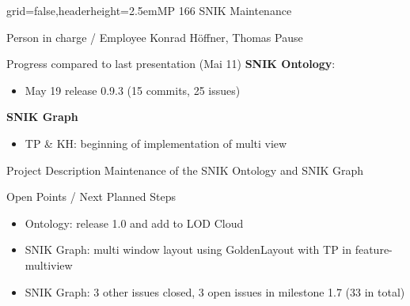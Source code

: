 \documentclass[english]{kiesgrube}
\begin{document}
\begin{poster}{grid=false,headerheight=2.5em}{}{MP 166 SNIK Maintenance}{}{}
\begin{posterbox}[name=person,column=0,row=0]{Person in charge / Employee}
Konrad Höffner, Thomas Pause
\end{posterbox}
\begin{posterbox}[name=progress,below=person]{Progress compared to last presentation (Mai 11)}
\textbf{SNIK Ontology}:
\begin{itemize}
\item May 19 release 0.9.3 (15 commits, 25 issues)
\end{itemize}
\textbf{SNIK Graph}
\begin{itemize}
\item TP \& KH: beginning of implementation of multi view
\end{itemize}
\end{posterbox}
\begin{posterbox}[name=description,column=1,row=0]{Project Description}
Maintenance of the SNIK Ontology and SNIK Graph
\end{posterbox}
\begin{posterbox}[name=open,column=1,below=description]{Open Points / Next Planned Steps}
\begin{itemize}
\item Ontology: release 1.0 and add to LOD Cloud
\item SNIK Graph: multi window layout using GoldenLayout with TP in feature-multiview
\item SNIK Graph: 3 other issues closed, 3 open issues in milestone 1.7 (33 in total)
\end{itemize}
\end{posterbox}

\end{poster}
\end{document}
